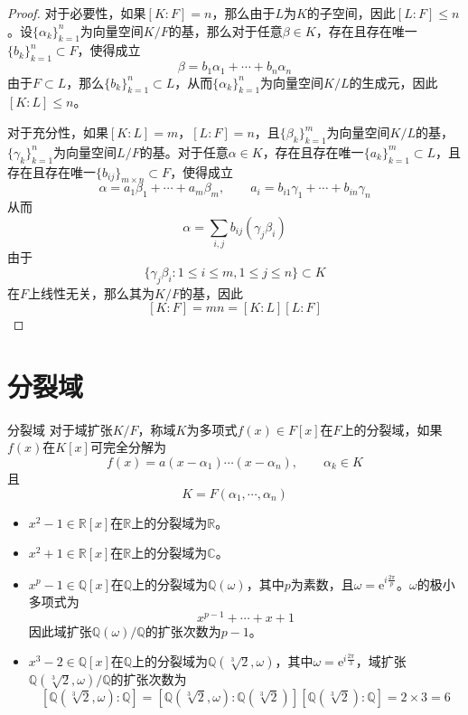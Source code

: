 \documentclass[lang = cn, scheme = chinese, thmcnt = section]{elegantbook}
\newcommand{\R}{\mathbb{R}}            %
\newcommand{\C}{\mathbb{C}}  		   %
\newcommand{\Q}{\mathbb{Q}}            %
\newcommand{\sub}{\subset}             %
\begin{document}
\begin{proof}
	对于必要性，如果$[K:F]=n$，那么由于$L$为$K$的子空间，因此$[L:F]\le n$。设$\{\alpha_k\}_{k=1}^{n}$为向量空间$K/F$的基，那么对于任意$\beta\in K$，存在且存在唯一$\{b_k\}_{k=1}^{n}\sub F$，使得成立
	$$
	\beta=b_1\alpha_1+\cdots+b_n\alpha_n
	$$
	由于$F\sub L$，那么$\{b_k\}_{k=1}^{n}\sub L$，从而$\{\alpha_k\}_{k=1}^{n}$为向量空间$K/L$的生成元，因此$[K:L]\le n$。
	
	对于充分性，如果$[K:L]=m$，$[L:F]=n$，且$\{\beta_k\}_{k=1}^{m}$为向量空间$K/L$的基，$\{\gamma_k\}_{k=1}^{n}$为向量空间$L/F$的基。对于任意$\alpha\in K$，存在且存在唯一$\{a_k\}_{k=1}^{m}\sub L$，且存在且存在唯一$\{b_{ij}\}_{m\times n}\sub F$，使得成立
	$$
	\alpha=a_1\beta_1+\cdots+a_m\beta_m,\qquad 
	a_i=b_{i1}\gamma_1+\cdots+b_{in}\gamma_n
	$$
	从而
	$$
	\alpha=\sum_{i,j}b_{ij}(\gamma_{j}\beta_{i})
	$$
	由于
	$$
	\{ \gamma_{j}\beta_{i}:1\le i\le m,1\le j\le n \}\sub K
	$$
	在$F$上线性无关，那么其为$K/F$的基，因此
	$$
	[K:F]=mn=[K:L][L:F]
	$$
\end{proof}

\section{分裂域}

\begin{definition}{分裂域}
	对于域扩张$K/F$，称域$K$为多项式$f(x)\in F[x]$在$F$上的分裂域，如果$f(x)$在$K[x]$可完全分解为
	$$
	f(x)=a(x-\alpha_1)\cdots(x-\alpha_n),\qquad \alpha_k\in K
	$$
	且
	$$
	K=F(\alpha_1,\cdots,\alpha_n)
	$$
\end{definition}

\begin{example}
	\begin{itemize}
		\item $x^2-1\in \R[x]$在$\R$上的分裂域为$\R$。
		\item $x^2+1\in \R[x]$在$\R$上的分裂域为$\C$。
		\item $x^p-1\in \Q[x]$在$\Q$上的分裂域为$\Q(\omega)$，其中$p$为素数，且$\omega=\mathrm{e}^{i\frac{2\pi}{p}}$。$\omega$的极小多项式为
		$$
		x^{p-1}+\cdots+x+1
		$$
		因此域扩张$\Q(\omega)/\Q$的扩张次数为$p-1$。
		\item $x^3-2\in\Q[x]$在$\Q$上的分裂域为$\Q(\sqrt[3]{2},\omega)$，其中$\omega=\mathrm{e}^{i\frac{2\pi}{3}}$，域扩张$\Q(\sqrt[3]{2},\omega)/\Q$的扩张次数为
		$$
		[\Q(\sqrt[3]{2},\omega):\Q]=[\Q(\sqrt[3]{2},\omega):\Q(\sqrt[3]{2})][\Q(\sqrt[3]{2}):\Q]=2\times 3=6
		$$
	\end{itemize}
\end{example}
\end{document}
